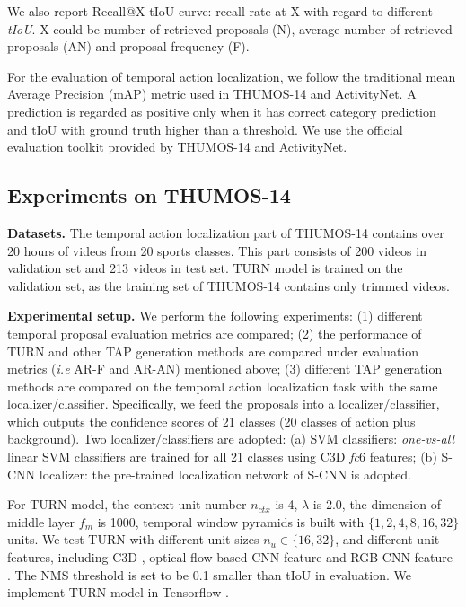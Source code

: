\documentclass[10pt,twocolumn,letterpaper]{article}
\begin{document}
 We also report Recall@X-tIoU curve: recall rate at X with regard to different \textit{tIoU}. X could be number of retrieved proposals (N), average number of retrieved proposals (AN) and proposal frequency (F).

 For the evaluation of temporal action localization, we follow the traditional mean Average Precision (mAP) metric used in THUMOS-14 and ActivityNet. A prediction is regarded as positive only when it has correct category prediction and tIoU with ground truth higher than a threshold. We use the official evaluation toolkit provided by THUMOS-14 and ActivityNet.
 
\subsection{Experiments on THUMOS-14} 
\label{chap:4.2}
\textbf{Datasets.} The temporal action localization part of THUMOS-14 contains over 20 hours of videos from 20 sports classes. This part consists of 200 videos in validation set and 213 videos in test set. TURN model is trained on the validation set, as the training set of THUMOS-14 contains only trimmed videos. 

\textbf{Experimental setup.} \label{sec: setup} We perform the following experiments: (1) different temporal proposal evaluation metrics are compared; (2) the performance of TURN and other TAP generation methods are compared under evaluation metrics  (\emph{i.e} AR-F and AR-AN) mentioned above; (3) different TAP generation methods are compared on the temporal action localization task with the same localizer/classifier. Specifically, we feed the proposals into a localizer/classifier, which outputs the confidence scores of 21 classes (20 classes of action plus background). Two localizer/classifiers are adopted: (a) SVM classifiers: \textit{one-vs-all} linear SVM classifiers are trained for all 21 classes using C3D \textit{fc}6 features; (b) S-CNN localizer: the pre-trained localization network of S-CNN \cite{Shou_2016_CVPR} is adopted. \label{sec: exp setup}

For TURN model, the context unit number $n_{ctx}$ is 4, $\lambda$ is 2.0, the dimension of middle layer $f_m$ is 1000, temporal window pyramids is built with $\{1,2,4,8,16,32\}$ units. We test TURN with different unit sizes $n_u \in \{16, 32\}$, and different unit features, including C3D \cite{tran2015learning}, optical flow based CNN feature and RGB CNN feature \cite{simonyan2014two}. The NMS threshold is set to be 0.1 smaller than tIoU in evaluation. We implement TURN model in Tensorflow \cite{abadi2015tensorflow}.
\end{document}
